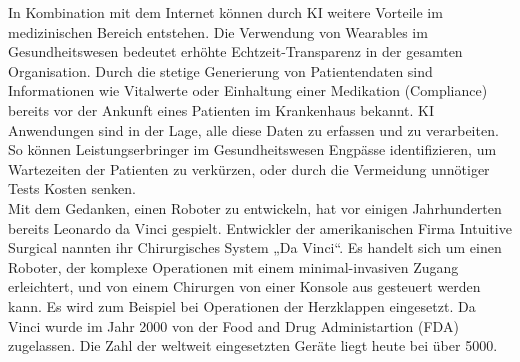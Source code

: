 In Kombination mit dem Internet können durch KI weitere Vorteile im medizinischen Bereich entstehen. Die Verwendung von Wearables im Gesundheitswesen bedeutet erhöhte Echtzeit-Transparenz in der gesamten Organisation.\cite{Chapter_14} Durch die stetige Generierung von Patientendaten sind Informationen wie Vitalwerte oder Einhaltung einer Medikation (Compliance) bereits vor der Ankunft eines Patienten im Krankenhaus bekannt. KI Anwendungen sind in der Lage, alle diese Daten zu erfassen und zu verarbeiten. So können Leistungserbringer im Gesundheitswesen Engpässe identifizieren, um Wartezeiten der Patienten zu verkürzen, oder durch die Vermeidung unnötiger Tests Kosten senken.\cite{Chapter_14}\\

Mit dem Gedanken, einen Roboter zu entwickeln, hat vor einigen Jahrhunderten bereits Leonardo da Vinci gespielt.\cite{AI_in_medicine} Entwickler der amerikanischen Firma Intuitive Surgical nannten ihr Chirurgisches System „Da Vinci“.\cite{AI_in_medicine} Es handelt sich um einen Roboter, der komplexe Operationen mit einem minimal-invasiven Zugang erleichtert, und von einem Chirurgen von einer Konsole aus gesteuert werden kann. Es wird zum Beispiel bei Operationen der Herzklappen eingesetzt. 
Da Vinci wurde im Jahr 2000 von der Food and Drug Administartion (FDA) zugelassen. Die Zahl der weltweit eingesetzten Geräte liegt heute bei über 5000.\cite{AI_in_medicine} 